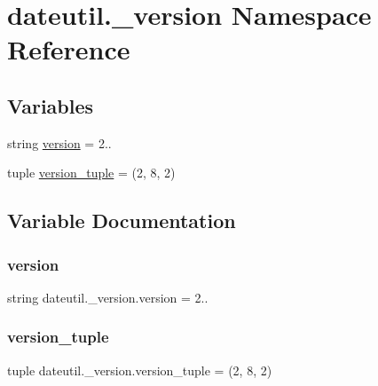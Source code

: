 \hypertarget{namespacedateutil_1_1__version}{}\section{dateutil.\+\_\+version Namespace Reference}
\label{namespacedateutil_1_1__version}
\subsection*{Variables}
\begin{DoxyCompactItemize}
\item 
string \hyperlink{namespacedateutil_1_1__version_af034b28ae8642dc16365f4f3941ba4ba}{version} = \textquotesingle{}2..\textquotesingle{}
\item 
tuple \hyperlink{namespacedateutil_1_1__version_ab02d25f8ce3ed2e4f5a37d97a3813403}{version\+\_\+tuple} = (2, 8, 2)
\end{DoxyCompactItemize}


\subsection{Variable Documentation}
\mbox{\label{namespacedateutil_1_1__version_af034b28ae8642dc16365f4f3941ba4ba}} 
\subsubsection{\texorpdfstring{version}{version}}
{\footnotesize\ttfamily string dateutil.\+\_\+version.\+version = \textquotesingle{}2..\textquotesingle{}}

\mbox{\label{namespacedateutil_1_1__version_ab02d25f8ce3ed2e4f5a37d97a3813403}} 
\subsubsection{\texorpdfstring{version\+\_\+tuple}{version\_tuple}}
{\footnotesize\ttfamily tuple dateutil.\+\_\+version.\+version\+\_\+tuple = (2, 8, 2)}

